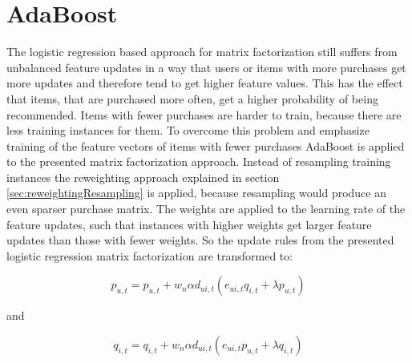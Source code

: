 \documentclass[10pt]{reportMaster}
\begin{document}
\section{AdaBoost}
\label{sec:myAdaBoost}
The logistic regression based approach for matrix factorization still suffers from unbalanced feature updates in a way that users or items with more purchases get more updates and therefore tend to get higher feature values.
This has the effect that items, that are purchased more often, get a higher probability of being recommended.
Items with fewer purchases are harder to train, because there are less training instances for them.
To overcome this problem and emphasize training of the feature vectors of items with fewer purchases AdaBoost is applied to the presented matrix factorization approach.
Instead of resampling training instances the reweighting approach explained in section \ref{sec:reweightingResampling} is applied, because resampling would produce an even sparser purchase matrix.
The weights are applied to the learning rate of the feature updates, such that instances with higher weights get larger feature updates than those with fewer weights.
So the update rules from the presented logistic regression matrix factorization are transformed to: 

\begin{equation}
p_{u,t} = p_{u,t} + w_n \alpha d_{ui,t} (e_{ui,t} q_{i,t} + \lambda p_{u,t})
\end{equation}

and 

\begin{equation}
q_{i,t} = q_{i,t} + w_n \alpha d_{ui,t} (e_{ui,t} p_{u,t} + \lambda q_{i,t})
\end{equation}
\end{document}
